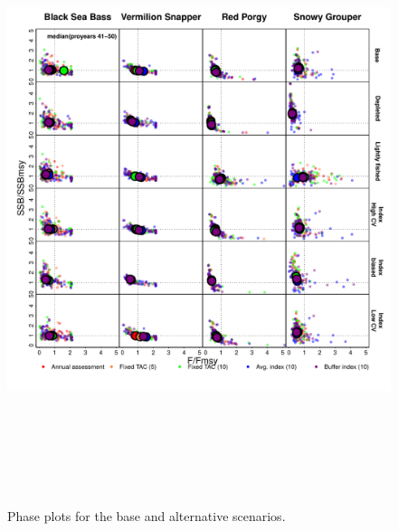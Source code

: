 \documentclass[12pt,english]{article}
\begin{document}
\begin{figure}[!ht]
\begin{center}
\includegraphics[width=6in,height=7in]{../Figs/phasePlot1.pdf}
\end{center}
\begin{flushleft}
\caption{Phase plots for the base and alternative scenarios.}
\label{fig:phasePlot1}
\end{flushleft}
\end{figure}



%
%
%
% 
%
% 
%


\end{document}
